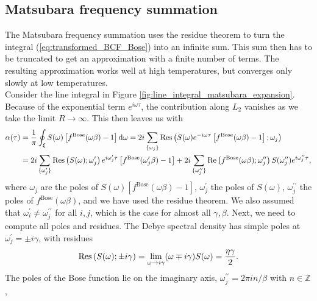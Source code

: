 \subsection*{Matsubara frequency summation}
The Matsubara frequency summation uses the residue theorem to turn the integral (\ref{eq:transformed_BCF_Bose}) into an infinite
sum. This sum then has to be truncated to get an approximation with a finite number of terms. The resulting approximation works well at high temperatures,
but converges only slowly at low temperatures.\\
Consider the line integral in Figure \ref{fig:line_integral_matsubara_expansion}. Because of the exponential term
$e^{i\omega\tau}$, the contribution along $L_2$ vanishes as we take the limit $R \rightarrow \infty$. This then leaves us with
\begin{equation*}
    \begin{split}
        \alpha(\tau) &= \frac{1}{\pi} \oint_\xi S(\omega) \left[
            f^\text{Bose}(\omega\beta)-1
        \right]\text{d}\omega = 2i \sum_{\{\omega_j\}}\Res\left(
            S(\omega)e^{-i\omega\tau}\left[
            f^\text{Bose}(\omega\beta)-1
            \right]; \omega_j\right) \\
            &= 2i \sum_{\{\omega_j^\prime\}} \Res\left(
                S(\omega); \omega_j^\prime
            \right) e^{i\omega_j^\prime\tau} \left[ f^\text{Bose}(\omega_j^\prime\beta)-1 \right]
            + 2i\sum_{\{\omega_j^{\prime\prime}\}}\Re\left(
                f^\text{Bose}(\omega\beta); \omega_j^{\prime\prime}
            \right) S(\omega_j^{\prime\prime}) e^{i\omega_j^{\prime\prime}\tau},
    \end{split}
\end{equation*}
where $\omega_j$ are the poles of $S(\omega) \left[f^\text{Bose}(\omega\beta)-1\right]$, $\omega_j^\prime$ the poles of
$S(\omega)$, $\omega_j^{\prime\prime}$ the poles of $f^\text{Bose}(\omega\beta)$, and we have used the residue theorem.
We also assumed that
$\omega_i^\prime \neq \omega_j^{\prime\prime}$ for all $i, j$, which is the case for almost all $\gamma, \beta$.
Next, we need to compute all poles and residues. The Debye spectral density has simple poles at $\omega_j^\prime=\pm i\gamma$,
with residues
\begin{equation*}
    \Residue\left(S(\omega);\pm i\gamma\right) = \lim_{\omega\rightarrow i\gamma}(\omega\mp i\gamma)S(\omega) = \frac{\eta\gamma}{2}.
\end{equation*}
The poles of the Bose function lie on the imaginary axis, $\omega_j^{\prime\prime} = 2\pi in/\beta$ with $n\in\mathbb{Z}$,
